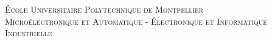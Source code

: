 \makeatletter
  \begin{titlepage}
  \centering
      {\Large \textsc{École Universitaire Polytechnique de Montpellier}}\\
      \textsc{Microélectronique et Automatique - Électronique et Informatique Industrielle }\\
    \noindent\hrulefill 
    \\
    \vspace{2 cm}
      {\large	\@date\\}
    \vspace{2cm}
       {\huge \textbf{\@title}} \\
	
	\vspace{1cm}

    \vspace{2em}
        {\large \@author} \\
    
    \vspace{2.6cm}
        \hfill
  \end{titlepage}
\makeatother